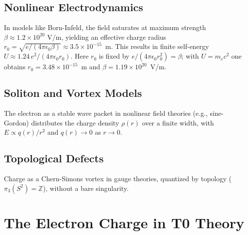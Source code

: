 	\subsection{Nonlinear Electrodynamics}
	In models like Born-Infeld, the field saturates at maximum strength $\beta \approx 1.2 \times 10^{20}$ V/m, yielding an effective charge radius $r_0 = \sqrt{e/(4\pi\epsilon_0 \beta)} \approx 3.5 \times 10^{-15}$~m. This results in finite self-energy $U \approx 1.24\, e^2 / (4\pi \epsilon_0 r_0)$. Here $r_0$ is fixed by $e/(4\pi\epsilon_0 r_0^2) = \beta$; with $U = m_e c^2$ one obtains $r_0 = 3.48\times10^{-15}$~m and $\beta = 1.19\times10^{20}$~V/m.
	
	\subsection{Soliton and Vortex Models}
	The electron as a stable wave packet in nonlinear field theories (e.g., sine-Gordon) distributes the charge density $\rho(r)$ over a finite width, with $E \propto q(r)/r^2$ and $q(r) \to 0$ as $r \to 0$.
	
	\subsection{Topological Defects}
	Charge as a Chern-Simons vortex in gauge theories, quantized by topology ($\pi_3(S^2) = \mathbb{Z}$), without a bare singularity.
	
	\begin{table}[h]
		\centering
		\caption{Comparison of alternative charge representations}
		\label{tab:comparison}
	\end{table}
	
	\section{The Electron Charge in T0 Theory}
	\label{sec:t0-charge}
	
